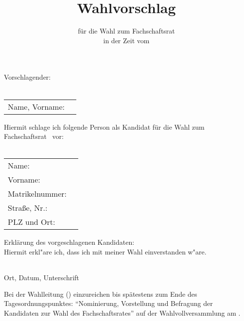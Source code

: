 


\parindent 0pt
\parskip 10pt

\title{Wahlvorschlag}
\subtitle{für die Wahl zum Fachschaftsrat \fach \\ in der Zeit vom \zeit}
\date{}



\pagestyle{empty}
\thispagestyle{empty}
\renewcommand{\titlepagestyle}{empty}

\maketitle


Vorschlagender:
\\
\vspace{0.5cm}\\
\begin{tabularx}{\textwidth}{lX}
Name, Vorname: & \underline{\hspace{10cm}} \vspace{0.5cm}\\
\end{tabularx}
Hiermit schlage ich folgende Person als Kandidat für die Wahl zum Fachschaftsrat \fach~vor:\\
\vspace{0.5cm}\\
\begin{tabularx}{\textwidth}{lX}
Name: & \underline{\hspace{10cm}} \vspace{0.5cm}\\
Vorname:  & \underline{\hspace{10cm}} \vspace{0.5cm}\\
Matrikelnummer: & \underline{\hspace{10cm}} \vspace{0.5cm}\\ 
Straße, Nr.:  & \underline{\hspace{10cm}} \vspace{0.5cm}\\
PLZ und Ort: & \underline{\hspace{10cm}} \vspace{0.5cm}\\
\end{tabularx}          
Erklärung des vorgeschlagenen Kandidaten:\\
Hiermit erkl"are ich, dass ich mit meiner Wahl einverstanden w"are.
\vspace{0.5cm}

\underline{\hspace{10cm}}\\
Ort, Datum, Unterschrift

Bei der Wahlleitung (\wahlleiter) einzureichen bis spätestens zum Ende des Tagesordnungspunktes:
``Nominierung, Vorstellung und Befragung der Kandidaten zur Wahl des Fachschaftsrates'' auf
der Wahlvollversammlung am \wahlvvDatum.

